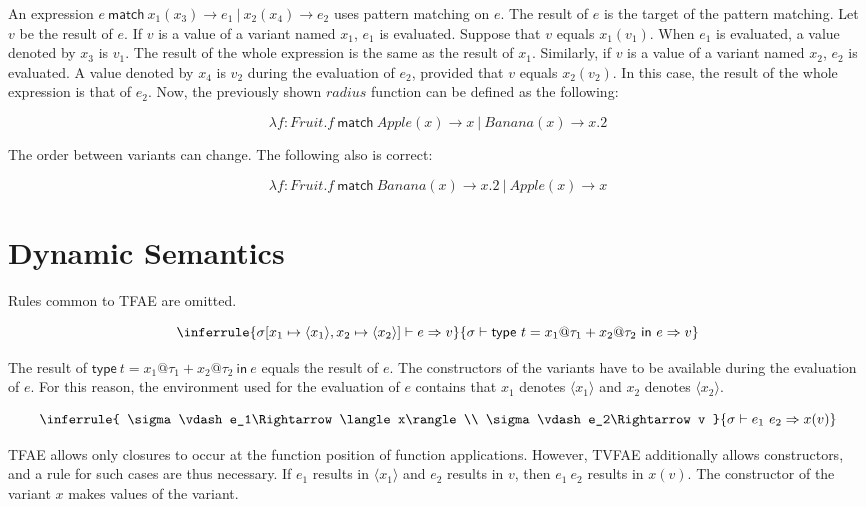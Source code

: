An expression \(e\ \textsf{match}\ x_1(x_3)\rightarrow e_1\ |\ x_2(x_4)\rightarrow
e_2\) uses pattern matching on $e$. The result of $e$ is the target of the
pattern matching. Let $v$ be the result of $e$. If $v$ is a value of a
variant named $x_1$, $e_1$ is evaluated. Suppose that $v$ equals
$x_1(v_1)$. When $e_1$ is evaluated, a value denoted by $x_3$ is $v_1$.
The result of the whole expression is the same as the result of $x_1$.
Similarly, if $v$ is a value of a variant named $x_2$, $e_2$ is evaluated.
A value denoted by $x_4$ is $v_2$ during the evaluation of $e_2$, provided
that $v$ equals $x_2(v_2)$. In this case, the result of the whole expression
is that of $e_2$. Now, the previously shown $radius$ function can be defined
as the following:

\[\lambda f:Fruit.f\ \textsf{match}\ Apple(x)\rightarrow x\ |\
Banana(x)\rightarrow x.2\]

The order between variants can change. The following also is correct:

\[\lambda f:Fruit.f\ \textsf{match}\ Banana(x)\rightarrow x.2\ |\
Apple(x)\rightarrow x\]

\section{Dynamic Semantics}

Rules common to TFAE are omitted.

\[
\inferrule
{ \sigma[x_1\mapsto \langle x_1\rangle,x_2\mapsto \langle x_2\rangle]\vdash
e\Rightarrow v }
{ \sigma\vdash \textsf{type}\ t=x_1@\tau_1+x_2@\tau_2\ \textsf{in}\ e\Rightarrow
v }
\]

The result of $\textsf{type}\ t=x_1@\tau_1+x_2@\tau_2\ \textsf{in}\ e$ equals the
result of $e$. The constructors of the variants have to be available during
the evaluation of $e$. For this reason, the environment used for the
evaluation of $e$ contains that $x_1$ denotes $\langle x_1\rangle$ and
$x_2$ denotes $\langle x_2\rangle$.

\[
\inferrule
{ \sigma\vdash e_1\Rightarrow \langle x\rangle \\
  \sigma\vdash e_2\Rightarrow v }
{ \sigma\vdash e_1\ e_2\Rightarrow x(v) }
\]

TFAE allows only closures to occur at the function position of function
applications. However, TVFAE additionally allows constructors, and a rule for
such cases are thus necessary. If $e_1$ results in $\langle x_1\rangle$ and
$e_2$ results in $v$, then $e_1\ e_2$ results in $x(v)$. The constructor
of the variant $x$ makes values of the variant.

